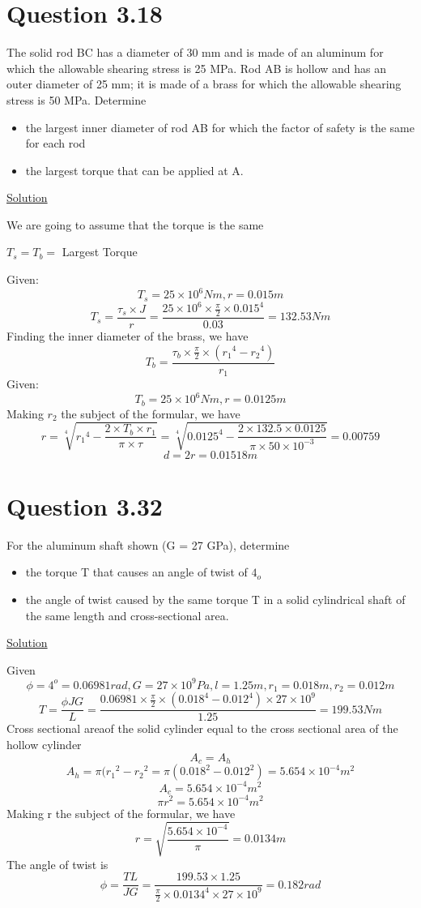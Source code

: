 \documentclass{article}
\begin{document}
\section*{Question 3.18}
The solid rod BC has a diameter of 30 mm and is made of an aluminum for which the allowable shearing stress is 25 MPa. Rod AB is hollow and has an outer diameter of 25 mm; it is made of a brass for which the allowable shearing stress is 50 MPa. Determine 
\begin{itemize}
\item the largest inner diameter of rod AB for which the factor of safety is the same for each rod
\item the largest torque that can be applied at A.
\end{itemize}
\begin{center}\underline{Solution}\end{center}
We are going to assume that the torque is the same
\begin{center}$T_{s} = T_{b} = $ Largest Torque\end{center}
Given: \[T_{s} = 25\times10^{6}Nm, r= 0.015m\]
\[T_{s} = \frac{\tau_{s}\times J}{r} = \frac{25\times10^{6}\times\frac{\pi}{2}\times{0.015}^{4}}{0.03} = 132.53Nm\]
Finding the inner diameter of the brass, we have
\[T_{b} = \frac{\tau_{b}\times\frac{\pi}{2}\times({r_{1}}^{4}-{r_{2}}^{4})}{r_{1}} \]
Given:\[T_{b} = 25\times10^{6}Nm, r= 0.0125m\]
Making $r_{2}$ the subject of the formular, we have
\[r = \sqrt[4]{{r_{1}}^{4} - \frac{2\times T_{b}\times r_{1}}{\pi\times\tau}}= \sqrt[4]{{0.0125}^{4} - \frac{2\times132.5\times 0.0125}{\pi\times50\times10^{-3}}} = 0.00759\]
\[d = 2r = 0.01518m\]


\section*{Question 3.32}
For the aluminum shaft shown (G = 27 GPa), determine 
\begin{itemize}
\item the torque T that causes an angle of twist of $4_{o}$
\item the angle of twist caused by the same torque T in a solid cylindrical shaft of the same length and cross-sectional area.
\end{itemize}

\begin{center}\underline{Solution}\end{center}
Given \[\phi =4^{o} = 0.06981rad, G = 27\times10^{9}Pa, l = 1.25m, r_{1} = 0.018m, r_{2} = 0.012m\]
\[T = \frac{\phi J G}{L} = \frac{0.06981\times\frac{\pi}{2}\times(0.018^{4}-0.012^{4})\times27\times10^{9}}{1.25} = 199.53Nm\]
Cross sectional areaof the solid cylinder equal to the cross sectional area of the hollow cylinder\[A_{c}=A_{h}\]
\[A_{h} = \pi({r_{1}}^{2} - {r_{2}}^{2} = \pi({0.018}^{2} - {0.012}^{2}) = 5.654\times10^{-4}m^{2}\]
\[A_{c} = 5.654\times10^{-4}m^{2}\]
\[\pi r^{2} = 5.654\times10^{-4}m^{2}\]
Making r the subject of the formular, we have
\[r = \sqrt{\frac{5.654\times10^{-4}}{\pi}}=0.0134m\]
The angle of twist is 
\[\phi = \frac{TL}{JG} = \frac{199.53\times1.25}{\frac{\pi}{2}\times0.0134^{4}\times27\times10^{9}} = 0.182rad\]
\end{document}

